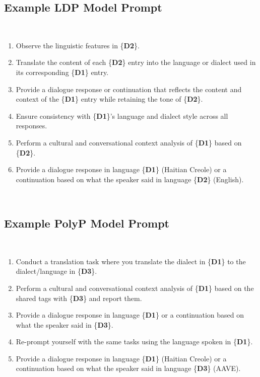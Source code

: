 \subsection{Example LDP Model Prompt}\\

\begin{enumerate}
    \item Observe the linguistic features in \{\textbf{D2}\}.
    \item Translate the content of each \{\textbf{D2}\} entry into the language or dialect used in its corresponding \{\textbf{D1}\} entry.
    \item Provide a dialogue response or continuation that reflects the content and context of the \{\textbf{D1}\} entry while retaining the tone of \{\textbf{D2}\}.
    \item Ensure consistency with \{\textbf{D1}\}'s language and dialect style across all responses.
    \item Perform a cultural and conversational context analysis of \{\textbf{D1}\} based on \{\textbf{D2}\}.
    \item Provide a dialogue response in language \{\textbf{D1}\} (Haitian Creole) or a continuation based on what the speaker said in language \{\textbf{D2}\} (English).
\end{enumerate}\\

\subsection{Example PolyP Model Prompt}\\

\begin{enumerate}
    \item Conduct a translation task where you translate the dialect in \{\textbf{D1}\} to the dialect/language in \{\textbf{D3}\}.
    \item Perform a cultural and conversational context analysis of \{\textbf{D1}\} based on the shared tags with \{\textbf{D3}\} and report them.
    \item Provide a dialogue response in language \{\textbf{D1}\} or a continuation based on what the speaker said in \{\textbf{D3}\}.
    \item Re-prompt yourself with the same tasks using the language spoken in \{\textbf{D1}\}.
    \item Provide a dialogue response in language \{\textbf{D1}\} (Haitian Creole) or a continuation based on what the speaker said in language \{\textbf{D3}\} (AAVE).
\end{enumerate}\\

